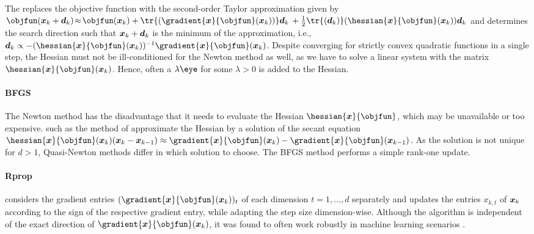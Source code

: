 The 
replaces the objective function with the second-order Taylor approximation
given by
$\objfun(\*x_k + \*d_k)
\!\approx\! \objfun(\*x_k) +
\tr{(\gradient{\*x}{\objfun}(\*x_k))} \*d_k \,+
\frac{1}{2} \tr{(\*d_k)} (\hessian{\*x}{\objfun}(\*x_k)) \*d_k$
and determines the search direction such that ${\boldsymbol{x}}_k + {\boldsymbol{d}}_k$ is
the minimum of the approximation, i.e.,
$\*d_k \propto
-(\hessian{\*x}{\objfun}(\*x_k))^{-1} \gradient{\*x}{\objfun}(\*x_k)$.
Despite converging for strictly convex quadratic functions in a single step,
the Hessian must not be ill-conditioned for the Newton method as well,
as we have to solve a linear system with the matrix
$\hessian{\*x}{\objfun}(\*x_k)$.
Hence, often a  $\lambda \eye$
for some $\lambda > 0$ is added to the Hessian.

\paragraph{BFGS}

The Newton method has the disadvantage that it needs to evaluate the
Hessian $\hessian{\*x}{\objfun}$,
which may be unavailable or too expensive.
 such as the method of
approximate the Hessian by a solution of the secant equation
$\hessian{\*x}{\objfun}(\*x_k) (\*x_k - \*x_{k-1}) \approx
\gradient{\*x}{\objfun}(\*x_k) - \gradient{\*x}{\objfun}(\*x_{k-1})$.
As the solution is not unique for $d > 1$,
Quasi-Newton methods differ in which solution to choose.
The BFGS method performs a simple rank-one update.

\paragraph{Rprop}

considers the gradient entries $(\gradient{\*x}{\objfun}(\*x_k))_t$
of each dimension $t = 1, \dotsc, d$ separately
and updates the entries $x_{k,t}$ of ${\boldsymbol{x}}_k$
according to the sign of the respective gradient entry,
while adapting the step size dimension-wise.
Although the algorithm is independent of the exact direction
of $\gradient{\*x}{\objfun}(\*x_k)$,
it was found to often work robustly in machine learning scenarios
\cite{Toussaint15Introduction}.

